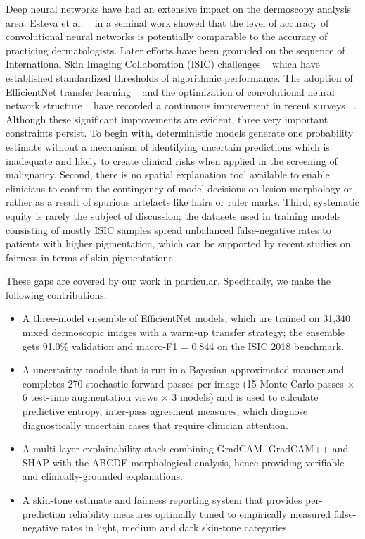 \documentclass[conference]{IEEEtran}
\begin{document}
Deep neural networks have had an extensive impact on the dermoscopy analysis area. Esteva et al. ~\cite{esteva2017dermatologist} in a seminal work showed that the level of accuracy of convolutional neural networks is potentially comparable to the accuracy of practicing dermatologists. Later efforts have been grounded on the sequence of International Skin Imaging Collaboration (ISIC) challenges ~\cite{marchetti2019algorithms} which have established standardized thresholds of algorithmic performance. The adoption of EfficientNet transfer learning ~\cite{kanchana2024efficientnet} and the optimization of convolutional neural network structure ~\cite{musthafa2024cnn} have recorded a continuous improvement in recent surveys ~\cite{behara2024ai, wu2022systematic}. Although these significant improvements are evident, three very important constraints persist. To begin with, deterministic models generate one probability estimate without a mechanism of identifying uncertain predictions which is inadequate and likely to create clinical risks when applied in the screening of malignancy. Second, there is no spatial explanation tool available to enable clinicians to confirm the contingency of model decisions on lesion morphology or rather as a result of spurious artefacts like hairs or ruler marks. Third, systematic equity is rarely the subject of discussion; the datasets used in training models consisting of mostly ISIC samples spread unbalanced false-negative rates to patients with higher pigmentation, which can be supported by recent studies on fairness in terms of skin pigmentationc~\cite{walker2024diverse, kinyanjui2020fairness}.


These gaps are covered by our work in particular. Specifically, we make the following contributions:

\begin{itemize}
\item A three-model ensemble of EfficientNet models, which are trained on 31,340 mixed dermoscopic images with a warm-up transfer strategy; the ensemble gets 91.0\% validation and macro-F1 = 0.844 on the ISIC 2018 benchmark.
\item A uncertainty module that is run in a Bayesian-approximated manner and completes 270 stochastic forward passes per image (15 Monte Carlo passes $\times$ 6 test-time augmentation views $\times$ 3 models) and is used to calculate predictive entropy, inter-pass agreement measures, which diagnose diagnostically uncertain cases that require clinician attention.
\item A multi-layer explainability stack combining GradCAM, GradCAM++ and SHAP with the ABCDE morphological analysis, hence providing verifiable and clinically-grounded explanations.
\item A skin-tone estimate and fairness reporting system that provides per-prediction reliability measures optimally tuned to empirically measured false-negative rates in light, medium and dark skin-tone categories.
\end{itemize}
\end{document}
